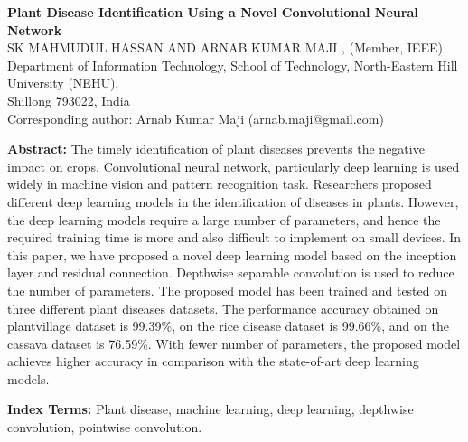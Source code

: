 \newcommand{\fig}[3]{
	\begin{figure}[!htb]
		\centering
		\texttt{[image: \#1.png]}
		\caption{#3}
		\label{#1-en}
	\end{figure}
}
\newcommand{\tab}[3]{
	\begin{table}[!htb]
		\centering
		\caption{#3} 
		\texttt{[image: \#1.png]}
		\label{#1-en}
	\end{table}
}


\tnr

\begin{center}
    \textbf{Plant Disease Identification Using a Novel Convolutional Neural Network}\\    
    \zuozhe SK MAHMUDUL HASSAN AND ARNAB KUMAR MAJI , (Member, IEEE)\\
    \xuexiao Department of Information Technology, School of Technology, North-Eastern Hill University (NEHU), \\
    Shillong 793022, India\\
    Corresponding author: Arnab Kumar Maji (arnab.maji@gmail.com)\\
\end{center}

\fontsize{10.5pt}{10.5pt}\selectfont

\noindent\textbf{Abstract: }The timely identification of plant diseases prevents the negative impact on crops. Convolutional neural network, particularly deep learning is used widely in machine vision and pattern recognition task. Researchers proposed different deep learning models in the identification of diseases in plants. However, the deep learning models require a large number of parameters, and hence the required training time is more and also difficult to implement on small devices. In this paper, we have proposed a novel deep learning model based on the inception layer and residual connection. Depthwise separable convolution is used to reduce the number of parameters. The proposed model has been trained and tested on three different plant diseases datasets. The performance accuracy obtained on plantvillage dataset is 99.39\%, on the rice disease dataset is 99.66\%, and on the cassava dataset is 76.59\%. With fewer number of parameters, the proposed model achieves higher accuracy in comparison with the state-of-art deep learning models.

\noindent\textbf{Index Terms: }Plant disease, machine learning, deep learning, depthwise convolution, pointwise convolution.

